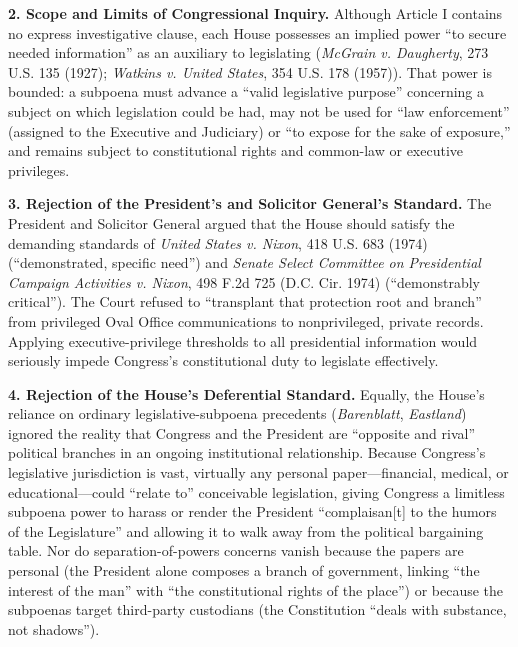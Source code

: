 \documentclass[12pt]{article}
\begin{document}
\textbf{2. Scope and Limits of Congressional Inquiry.} Although Article I contains no express investigative clause, each House possesses an implied power ``to secure needed information'' as an auxiliary to legislating (\textit{McGrain v. Daugherty}, 273 U.S. 135 (1927); \textit{Watkins v. United States}, 354 U.S. 178 (1957)). That power is bounded: a subpoena must advance a ``valid legislative purpose'' concerning a subject on which legislation could be had, may not be used for ``law enforcement'' (assigned to the Executive and Judiciary) or ``to expose for the sake of exposure,'' and remains subject to constitutional rights and common-law or executive privileges.

\textbf{3. Rejection of the President's and Solicitor General's Standard.} The President and Solicitor General argued that the House should satisfy the demanding standards of \textit{United States v. Nixon}, 418 U.S. 683 (1974) (``demonstrated, specific need'') and \textit{Senate Select Committee on Presidential Campaign Activities v. Nixon}, 498 F.2d 725 (D.C. Cir. 1974) (``demonstrably critical''). The Court refused to ``transplant that protection root and branch'' from privileged Oval Office communications to nonprivileged, private records. Applying executive-privilege thresholds to all presidential information would seriously impede Congress's constitutional duty to legislate effectively.

\textbf{4. Rejection of the House's Deferential Standard.} Equally, the House's reliance on ordinary legislative-subpoena precedents (\textit{Barenblatt}, \textit{Eastland}) ignored the reality that Congress and the President are ``opposite and rival'' political branches in an ongoing institutional relationship. Because Congress's legislative jurisdiction is vast, virtually any personal paper---financial, medical, or educational---could ``relate to'' conceivable legislation, giving Congress a limitless subpoena power to harass or render the President ``complaisan[t] to the humors of the Legislature'' and allowing it to walk away from the political bargaining table. Nor do separation-of-powers concerns vanish because the papers are personal (the President alone composes a branch of government, linking ``the interest of the man'' with ``the constitutional rights of the place'') or because the subpoenas target third-party custodians (the Constitution ``deals with substance, not shadows'').
\end{document}

